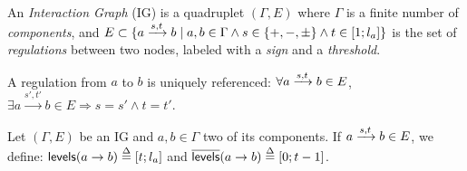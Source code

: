 \begin{definition}
\label{def:ig}
An \emph{Interaction Graph} (IG) is a quadruplet $(\Gamma, E)$ where $\Gamma$ is a finite number of \emph{components},
and $E \subset \{ \GRNedge{a}{s}{t}{b} %
\mid a, b \in \Gamma \wedge s \in \{ +, -, \uns \} \wedge t \in [1; l_a]\}$
is the set of 
\emph{regulations} between two nodes, labeled with a \emph{sign} and a \emph{threshold}.

A regulation from $a$ to $b$ is uniquely referenced:
$\forall a \xrightarrow{s, t} b \in E$, 
$\exists a \xrightarrow{s', t'} b \in E \Rightarrow s = s' \wedge t = t'$.
\end{definition}

\begin{definition}\label{def:levels}
Let $(\Gamma,E)$ be an IG and $a, b \in \Gamma$ two of its components.
If $a \xrightarrow{s, t} b \in E$, we define: $\mathsf{levels}(a\rightarrow b) \stackrel{\Delta}= [t; l_a]$ and $\overline{\mathsf{levels}}(a\rightarrow b) \stackrel{\Delta}= [0; t-1]$.
\end{definition}

